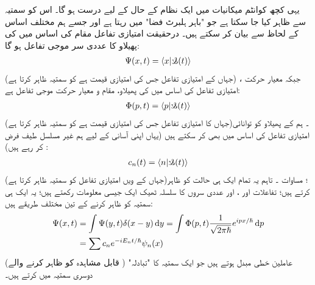  یہی کچھ کوانٹم میکانیات میں  ایک نظام کے حال کے لیے  درست ہو گا۔ اس کو سمتیہ  سے ظاہر کیا جا سکتا ہے جو "باہر ہلبرٹ فضا"  میں رہتا ہے اور  جسے  ہم     مختلف اساس کے لحاظ سے   بیان کر سکتے ہیں۔ درحقیقت امتیازی تفاعل مقام کی اساس میں  کی پھیلاو کا عددی سر موجی تفاعل  ہو گا:
\begin{align}
\Psi(x,t) = \langle x | \s(t) \rangle 
\end{align}
(جہاں  کے امتیازی تفاعل جس کی امتیازی قیمت  ہے کو سمتیہ  ظاہر کرتا ہے)  ، جبکہ معیار حرکت  امتیازی تفاعل   کی اساس میں  کی پھیلاو،   مقام و معیار حرکت موجی تفاعل    ہے:
\begin{align}
\Phi(p,t) = \langle p | \s (t) \rangle
\end{align}
(جہاں  کا امتیازی تفاعل جس کی امتیازی قیمت  ہے کو سمتیہ  ظاہر کرتا ہے)۔ ہم   کے پھیلاو کو  توانائی امتیازی تفاعل   کی اساس  میں بھی کر سکتے ہیں (یہاں اپنی آسانی کے لیے ہم غیر مسلسل طیف فرض کر رہے ہیں) :
\begin{align}
c_{n} (t) = \langle n | \s (t) \rangle
\end{align}
(جہاں  کے  ویں امتیازی تفاعل کو سمتیہ   ظاہر کرتا ہے)؛  مساوات ۔ تاہم یہ تمام ایک ہی حالت کو ظاہر کرتے ہیں؛  تفاعلات  اور ،  اور عددی سروں کا سلسلہ  ٹھیک  ایک جیسی  معلومات رکھتے ہیں؛  یہ  ایک ہی سمتیہ  کو ظاہر کرنے کے تین مختلف طریقے ہیں:
\begin{align}
\Psi (x,t) &= \int \Psi(y,t) \delta (x-y) \dif y = \int \Phi (p,t) \frac{1}{\sqrt{2\pi\hslash}} e^{ipx/\hslash} \dif p \nonumber \\ 
&= \sum c_{n} e^{-iE_{n}t/\hslash} \psi_{n}(x)
\end{align}
(قابل مشاہدہ کو ظاہر کرنے والے ) عاملین خطی  مبدل  ہوتے ہیں جو ایک سمتیہ کا "تبادلہ"  دوسری سمتیہ میں کرتے ہیں۔

